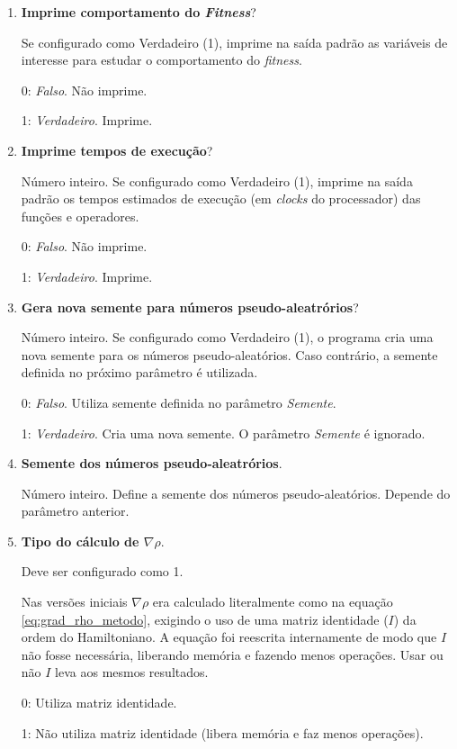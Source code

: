 \begin{enumerate}
\begin{itemize}
		\end{itemize}
		
		\item \textbf{Imprime comportamento do \emph{Fitness}}?
		
		Se configurado como Verdadeiro (1), imprime na saída padrão as variáveis de interesse para estudar o comportamento do \emph{fitness}. 
		
			0: \emph{Falso}. Não imprime.
			
			1: \emph{Verdadeiro}. Imprime.
		
		\item \textbf{Imprime tempos de execução}?
		
			Número inteiro. Se configurado como Verdadeiro (1), imprime na saída padrão os tempos estimados de execução (em \emph{clocks} do processador) das funções e operadores.
			
			
			0: \emph{Falso}. Não imprime.
			
			1: \emph{Verdadeiro}. Imprime.
			
		
		\item \textbf{Gera nova semente para números pseudo-aleatrórios}?
		
		Número inteiro. Se configurado como Verdadeiro (1), o programa cria uma nova semente para os números pseudo-aleatórios. Caso contrário, a semente definida no próximo parâmetro é utilizada.
		
		0: \emph{Falso}. Utiliza semente definida no parâmetro \emph{Semente}.
		
		1: \emph{Verdadeiro}. Cria uma nova semente. O parâmetro \emph{Semente} é ignorado.
		
		\item \textbf{Semente dos números pseudo-aleatrórios}.
		
		Número inteiro. Define a semente dos números pseudo-aleatórios. Depende do parâmetro anterior.
		
		\item \textbf{Tipo do cálculo de $\nabla \rho$}.
		
		Deve ser configurado como 1.
		
		Nas versões iniciais $\nabla \rho$ era calculado literalmente como na equação \ref{eq:grad_rho_metodo}, exigindo o uso de uma matriz identidade ($I$) da ordem do Hamiltoniano. A equação foi reescrita internamente de modo que $I$ não fosse necessária, liberando memória e fazendo menos operações. Usar ou não $I$ leva aos mesmos resultados.
		
		0: Utiliza matriz identidade.
		
		1: Não utiliza matriz identidade (libera memória e faz menos operações).
		
	\end{enumerate}
	
